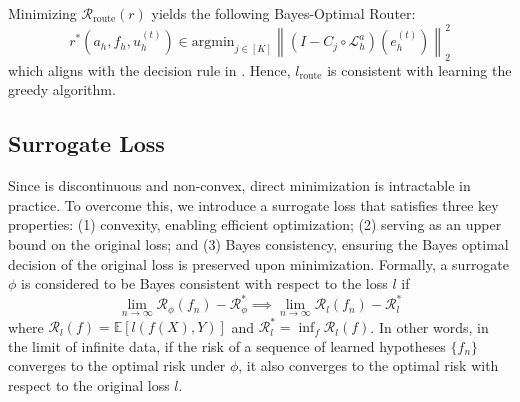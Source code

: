 \documentclass{article} %
\begin{document}
Minimizing $\mathcal{R}_{\text{route}}\left(r\right)$ yields the following Bayes-Optimal Router:
\begin{equation}\label{eq:bayesoptimalrouter}
    r^*(a_h, f_h, u^{(t)}_h) \in \text{argmin}_{j \in [K]} \left\|\left( I - C_{j} \circ \mathcal{L}_{h}^a\right)\left(e^{(t)}_h\right)\right\|^2_2
\end{equation} 
which aligns with the decision rule in . Hence, $l_{\text{route}}$ is consistent with learning the greedy algorithm.

\subsection{Surrogate Loss}

Since  is discontinuous and non-convex, direct minimization is intractable in practice. To overcome this, we introduce a surrogate loss that satisfies three key properties: (1) convexity, enabling efficient optimization; (2) serving as an upper bound on the original loss; and (3) Bayes consistency, ensuring the Bayes optimal decision of the original loss is preserved upon minimization. Formally, a surrogate $\phi$ is considered to be Bayes consistent with respect to the loss $l$ if 
\begin{equation*}
    \lim_{n \to \infty} \mathcal{R}_{\phi}(f_n) - \mathcal{R}_{\phi}^* \implies \lim_{n \to \infty} \mathcal{R}_{l}(f_n) - \mathcal{R}_{l}^* 
\end{equation*}
where $\mathcal{R}_{l}(f) = \mathbb{E}\left[l(f(X), Y)\right]$ and $\mathcal{R}_{l}^* = \inf_f\mathcal{R}_{l}(f)$. In other words, in the limit of infinite data, if the risk of a sequence of learned hypotheses $\{f_n\}$ converges to the optimal risk under $\phi$, it also converges to the optimal risk with respect to the original loss $l$.
\end{document}
